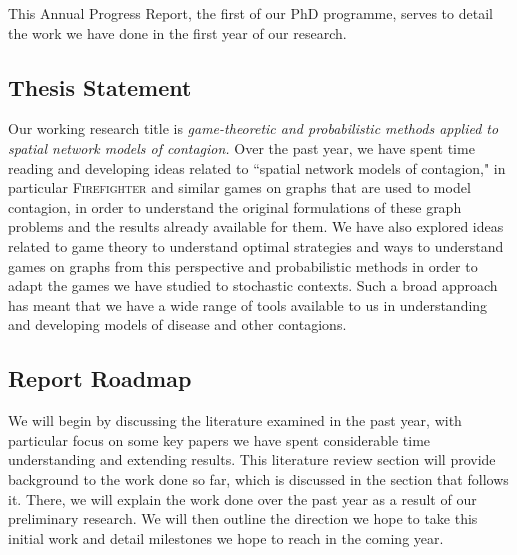 \documentclass[../report.tex]{subfiles}
\begin{document}
This Annual Progress Report, the first of our PhD programme, serves to detail the work we have done in the first year of our research.

\subsection{Thesis Statement}

Our working research title is {\it game-theoretic and probabilistic methods applied to spatial network models of contagion.} Over the past year, we have spent time reading and developing ideas related to ``spatial network models of contagion," in particular {\scshape Firefighter} and similar games on graphs that are used to model contagion, in order to understand the original formulations of these graph problems and the results already available for them. We have also explored ideas related to game theory to understand optimal strategies and ways to understand games on graphs from this perspective and probabilistic methods in order to adapt the games we have studied to stochastic contexts. Such a broad approach has meant that we have a wide range of tools available to us in understanding and developing models of disease and other contagions.

\subsection{Report Roadmap}

We will begin by discussing the literature examined in the past year, with particular focus on some key papers we have spent considerable time understanding and extending results. This literature review section will provide background to the work done so far, which is discussed in the section that follows it. There, we will explain the work done over the past year as a result of our preliminary research. We will then outline the direction we hope to take this initial work and detail milestones we hope to reach in the coming year.
\end{document}
